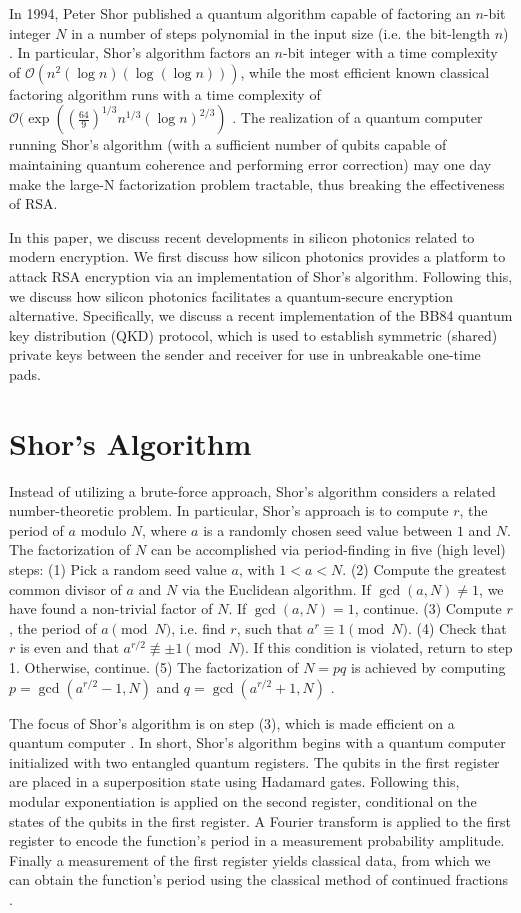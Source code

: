 \documentclass[letterpaper, 10 pt, conference]{ieeeconf}  %
\begin{document}
In 1994, Peter Shor published a quantum algorithm capable of factoring an $n$-bit integer $N$ in a number of steps polynomial in the input size (i.e. the bit-length $n$) \cite{shor94}. In particular, Shor's algorithm factors an $n$-bit integer with a time complexity of $\mathcal{O}(n^2(\log n)(\log(\log n)))$, while the most efficient known classical factoring algorithm runs with a time complexity of $\mathcal{O}(\exp((\frac{64}{9})^{1/3} n^{1/3}(\log n)^{2/3})$ \cite{GNFS}. The realization of a quantum computer running Shor's algorithm (with a sufficient number of qubits capable of maintaining quantum coherence and performing error correction) may one day make the large-N factorization problem tractable, thus breaking the effectiveness of RSA. 

In this paper, we discuss recent developments in silicon photonics related to modern encryption. We first discuss how silicon photonics provides a platform to attack RSA encryption via an implementation of Shor's algorithm. Following this, we discuss how silicon photonics facilitates a quantum-secure encryption alternative. Specifically, we discuss a recent implementation of the BB84 quantum key distribution (QKD) protocol, which is used to establish symmetric (shared) private keys between the sender and receiver for use in unbreakable one-time pads. 

\section{Shor's Algorithm}
Instead of utilizing a brute-force approach, Shor's algorithm considers a related number-theoretic problem. In particular, Shor's approach is to compute $r$, the period of $a$ modulo $N$, where $a$ is a randomly chosen seed value between $1$ and $N$. The factorization of $N$ can be accomplished via period-finding in five (high level) steps: (1) Pick a random seed value $a$, with $1 < a < N$. (2) Compute the greatest common divisor of $a$ and $N$ via the Euclidean algorithm. If $\gcd(a,N) \not = 1$, we have found a non-trivial factor of $N$. If $\gcd(a,N)=1$, continue. (3) Compute $r$, the period of $a \pmod{N}$, i.e. find $r$, such that $a^r \equiv 1 \pmod{N}$. (4) Check that $r$ is even and that $a^{r/2}\not \equiv \pm 1 \pmod{N}$. If this condition is violated, return to step 1. Otherwise, continue. (5) The factorization of $N = pq$ is achieved by computing $p = \gcd(a^{r/2} - 1, N)$ and $q = \gcd(a^{r/2} + 1, N)$ \cite{shor94}.

The focus of Shor's algorithm is on step (3), which is made efficient on a quantum computer \cite{shor94, shorssmall}. In short, Shor's algorithm begins with a quantum computer initialized with two entangled quantum registers. The qubits in the first register are placed in a superposition state using Hadamard gates. Following this, modular exponentiation is applied on the second register, conditional on the states of the qubits in the first register. A Fourier transform is applied to the first register to encode the function's period in a measurement probability amplitude. Finally a measurement of the first register yields classical data, from which we can obtain the function's period using the classical method of continued fractions \cite{shor94}.
\end{document}
